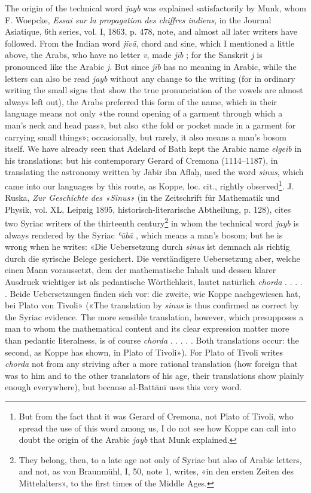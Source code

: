 \documentclass[11pt]{article}
\newcommand{\Pg}[1]{\marginpar{\footnotesize\color{gray}#1}}
\begin{document}
\par \Pg{I 156}The origin of the technical word \emph{jayb} was explained satisfactorily by Munk, whom F. Woepcke, \emph{Essai sur la propagation des chiffres indiens}, in the Journal Asiatique, 6th series, vol. I, 1863, p. 478, note, and almost all later writers have followed. From the Indian word \emph{jīvā}, chord and sine, which I mentioned a little above, the Arabs, who have no letter \emph{v}, made \emph{jīb} ; for the Sanskrit \emph{j} is pronounced like the Arabic \emph{j}. But since \emph{jīb} has no meaning in Arabic, while the letters  can also be read \emph{jayb} without any change to the writing (for in ordinary writing the small signs that show the true pronunciation of the vowels are almost always left out), the Arabs preferred this form of the name, which in their language means not only «the round opening of a garment through which a man's neck and head pass», but also «the fold or pocket made in a garment for carrying small things»; occasionally, but rarely, it also means a man's bosom itself. We have already seen that Adelard of Bath kept the Arabic name \emph{elgeib} in his translations; but his contemporary Gerard of Cremona (1114–1187), in translating the astronomy written by Jābir ibn Aflaḥ, used the word \emph{sinus}, which came into our languages by this route, as Koppe, loc. cit., rightly observed\footnote{But from the fact that it was Gerard of Cremona, not Plato of Tivoli, who spread the use of this word among us, I do not see how Koppe can call into doubt the origin of the Arabic \emph{jayb} that Munk explained.}. J. Ruska, \emph{Zur Geschichte des «Sinus»} (in the Zeitschrift für Mathematik und Physik, vol. XL, Leipzig 1895, historisch-literarische Abtheilung, p. 128), cites two Syriac writers of the thirteenth century\footnote{They belong, then, to a late age not only of Syriac but also of Arabic letters, and not, as von Braunmühl, I, 50, note 1, writes, «in den ersten Zeiten des Mittelalters», to the first times of the Middle Ages.} in whom the technical word \emph{jayb} is always rendered by the Syriac \emph{ʿūbā} , which means a man's bosom; but he is wrong when he writes: «Die Uebersetzung durch \emph{sinus} ist demnach als richtig durch die syrische Belege gesichert. Die verständigere Uebersetzung aber, welche einen Mann voraussetzt, dem der mathematische Inhalt und dessen klarer Ausdruck wichtiger ist als pedantische Wörtlichkeit, lautet natürlich \emph{chorda} . . . . . Beide Uebersetzungen finden sich vor: die zweite, wie Koppe nachgewiesen hat, bei Plato von Tivoli» («The translation by \emph{sinus} is thus confirmed as correct by the Syriac evidence. The more sensible translation, however, which presupposes a man to whom the mathematical content and its clear expression matter more than pedantic literalness, is of course \emph{chorda} . . . . . Both translations occur: the second, as Koppe has shown, in Plato of Tivoli»). For Plato of Tivoli writes \emph{chorda} not from any striving after a more rational translation (how foreign that was to him and to the other translators of his age, their translations show plainly enough everywhere), but because al-Battānī uses this very word.\par
\end{document}
